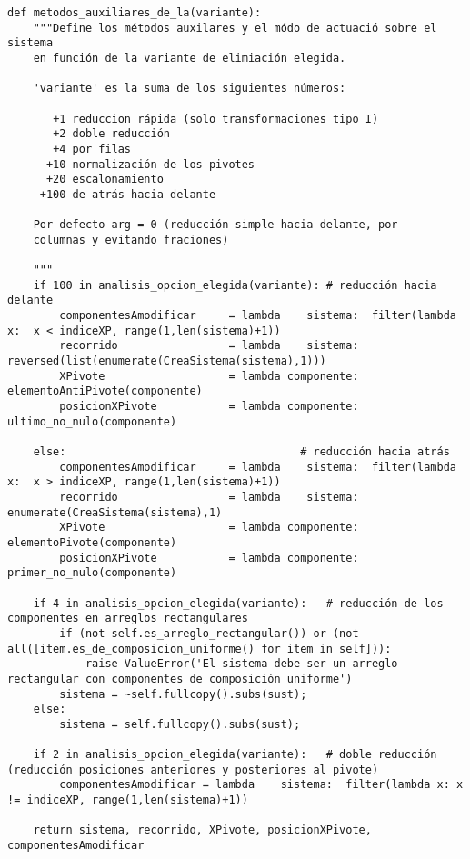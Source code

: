 \documentclass[11pt]{report}
\begin{document}
\begin{verbatim}
def metodos_auxiliares_de_la(variante):
    """Define los métodos auxilares y el módo de actuació sobre el sistema
    en función de la variante de elimiación elegida.

    'variante' es la suma de los siguientes números:
        
       +1 reduccion rápida (solo transformaciones tipo I)
       +2 doble reducción
       +4 por filas
      +10 normalización de los pivotes
      +20 escalonamiento
     +100 de atrás hacia delante
    
    Por defecto arg = 0 (reducción simple hacia delante, por
    columnas y evitando fraciones)

    """
    if 100 in analisis_opcion_elegida(variante): # reducción hacia delante
        componentesAmodificar     = lambda    sistema:  filter(lambda x:  x < indiceXP, range(1,len(sistema)+1))
        recorrido                 = lambda    sistema:  reversed(list(enumerate(CreaSistema(sistema),1)))
        XPivote                   = lambda componente:  elementoAntiPivote(componente)
        posicionXPivote           = lambda componente:  ultimo_no_nulo(componente)
                
    else:                                    # reducción hacia atrás
        componentesAmodificar     = lambda    sistema:  filter(lambda x:  x > indiceXP, range(1,len(sistema)+1))
        recorrido                 = lambda    sistema:  enumerate(CreaSistema(sistema),1)
        XPivote                   = lambda componente:  elementoPivote(componente)
        posicionXPivote           = lambda componente:  primer_no_nulo(componente)
        
    if 4 in analisis_opcion_elegida(variante):   # reducción de los componentes en arreglos rectangulares
        if (not self.es_arreglo_rectangular()) or (not all([item.es_de_composicion_uniforme() for item in self])):
            raise ValueError('El sistema debe ser un arreglo rectangular con componentes de composición uniforme')
        sistema = ~self.fullcopy().subs(sust);
    else:
        sistema = self.fullcopy().subs(sust);

    if 2 in analisis_opcion_elegida(variante):   # doble reducción (reducción posiciones anteriores y posteriores al pivote)
        componentesAmodificar = lambda    sistema:  filter(lambda x: x != indiceXP, range(1,len(sistema)+1))

    return sistema, recorrido, XPivote, posicionXPivote, componentesAmodificar


\end{verbatim}
\end{document}
